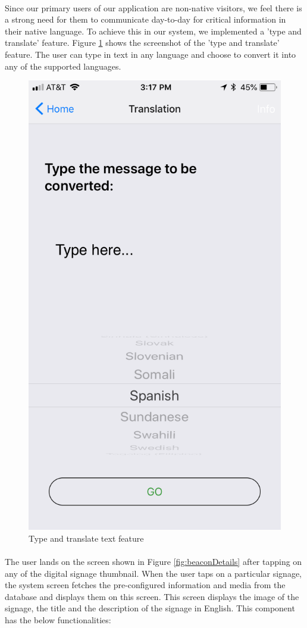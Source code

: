 \documentclass[12pt]{article}
\begin{document}
\paragraph{} Since our primary users of our application are non-native visitors, we feel there is a strong need for them to communicate day-to-day for critical information in their native language. To achieve this in our system, we implemented a 'type and translate' feature. Figure \ref{fig:type} shows the screenshot of the 'type and translate' feature. The user can type in text in any language and choose to convert it into any of the supported languages. 
\begin{figure}[H]
	\centering
	\includegraphics[width=0.5\linewidth]{media/5.PNG}
	\caption{Type and translate text feature}
	\label{fig:type}
\end{figure} 

\paragraph{} The user lands on the screen shown in Figure \ref{fig:beaconDetails} after tapping on any of the digital signage thumbnail. When the user taps on a particular signage, the system screen fetches the pre-configured information and media from the database and displays them on this screen. This screen displays the image of the signage, the title and the description of the signage in English. This component  has the below functionalities:
\end{document}
